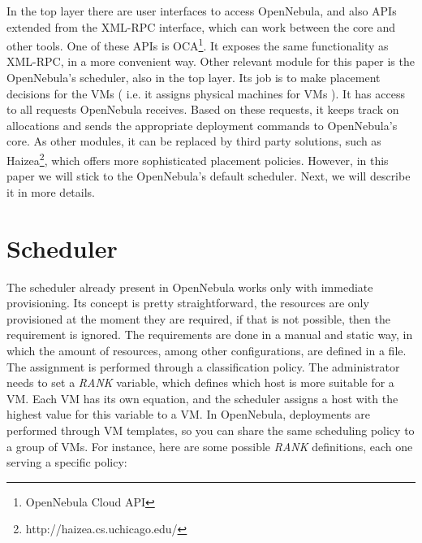 In the top layer there are user interfaces to access OpenNebula, and also APIs extended from the XML-RPC interface, which can work between the core and other tools. One of these APIs is  OCA\footnote{OpenNebula Cloud API}. It exposes the same functionality as XML-RPC, in a more convenient way. Other relevant module for this paper is the OpenNebula's scheduler, also in the top layer. Its job is to make placement decisions for the VMs ( i.e. it assigns physical machines for VMs ). It has access to all requests OpenNebula receives. Based on these requests, it keeps track on allocations and sends the appropriate deployment commands to OpenNebula's core. As other modules, it can be replaced by third party solutions, such as Haizea\footnote{http://haizea.cs.uchicago.edu/},  which offers more sophisticated placement policies. However, in this paper we will stick to the OpenNebula's default scheduler. Next, we will describe it in more details.

\section{Scheduler}

The scheduler already present in OpenNebula works only with immediate provisioning. Its concept is pretty straightforward, the resources are only provisioned at the moment they are required, if that is not possible, then the requirement is ignored. The requirements are done in a manual and static way, in which the amount of resources, among other configurations, are defined in a file. The assignment is performed through a classification policy.  The administrator needs to set a \textit{RANK} variable, which defines which host is more suitable for a VM. Each VM has its own  equation, and the scheduler assigns a host with the highest value for this variable to a VM. In OpenNebula, deployments are performed through VM templates, so you can share the same scheduling policy  to a group of VMs. For instance, here are some possible \textit{RANK} definitions, each one serving a specific policy:

